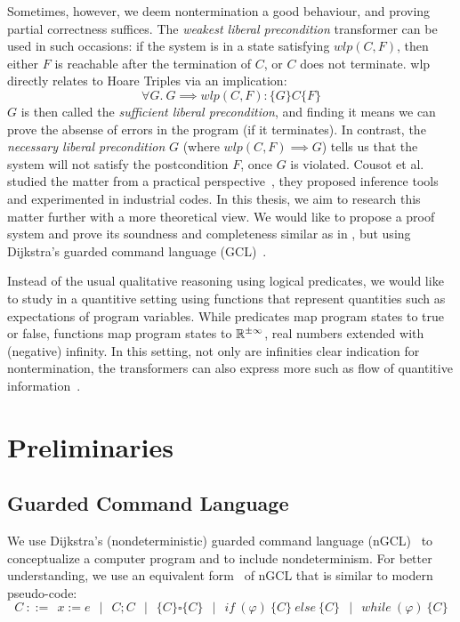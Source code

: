 \documentclass[adraft,hidelinks]{eptcs}
\begin{document}
Sometimes, however, we deem nontermination a good behaviour, and proving partial correctness suffices. 
The \textit{weakest liberal precondition} transformer \cite{Dijkstra1990} can be used in such occasions: 
if the system is in a state satisfying $wlp(C,F)$, then either $F$ is reachable after the termination of $C$, or $C$ does not terminate.
wlp directly relates to Hoare Triples via an implication: 
\[\forall G.\ G\implies wlp(C,F): \{G\} C \{F\}\]
$G$ is then called the \textit{sufficient liberal precondition}, and finding it means we can prove the absense of errors in the program (if it terminates). 
In contrast, the \textit{necessary liberal precondition} $G$ (where $ wlp(C,F)\implies G$) tells us that the system will not satisfy the postcondition $F$, once $G$ is violated. 
Cousot et al. studied the matter from a practical perspective~\cite{Cousot2013}, they proposed inference tools and experimented in industrial codes.
In this thesis, we aim to research this matter further with a more theoretical view. 
We would like to propose a proof system and prove its soundness and completeness similar as in \cite{Vries2011}, but using Dijkstra's guarded command language (GCL)~\cite{Dijkstra1975}. 

Instead of the usual qualitative reasoning using logical predicates, we would like to study in a quantitive setting using functions that represent quantities such as expectations of program variables. 
While predicates map program states to true or false, functions map program states to $\mathbb{R}^{\pm\infty}$, real numbers extended with (negative) infinity. 
In this setting, not only are infinities clear indication for nontermination, the transformers can also express more such as flow of quantitive information~\cite{Zhang2022}.


\section{Preliminaries}
\subsection{Guarded Command Language}
We use Dijkstra's (nondeterministic) guarded command language (nGCL)~\cite{Dijkstra1975} to conceptualize a computer program and to include nondeterminism. 
For better understanding, we use an equivalent form~\cite{Zhang2022} of nGCL that is similar to modern pseudo-code: 
$$C\ ::=\ \  x:= e \ \ \mid\ \  C;C \ \ \mid\ \  \{C\} \square \{C\} \ \ \mid\ \  
if\ (\varphi)\ \{C\}\ else\ \{C\} \ \ \mid\ \  while\ (\varphi)\ \{C\}$$
\end{document}
